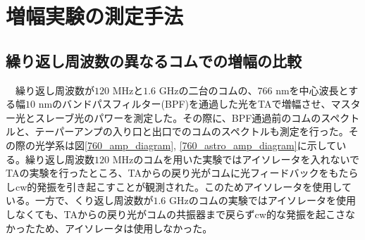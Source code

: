 \documentclass[uplatex, dvipdfmx, a4paper, report, papersize, 11pt]{jsbook}
\begin{document}
\newpage
\section{増幅実験の測定手法}
\subsection{繰り返し周波数の異なるコムでの増幅の比較}
　繰り返し周波数が$120$ MHzと$1.6$ GHzの二台のコムの、$766$ nmを中心波長とする幅$10$ nmのバンドパスフィルター(BPF)を通過した光をTAで増幅させ、マスター光とスレーブ光のパワーを測定した。その際に、BPF通過前のコムのスペクトルと、テーパーアンプの入り口と出口でのコムのスペクトルも測定を行った。その際の光学系は図\ref{760_amp_diagram}, \ref{760_astro_amp_diagram}に示している。繰り返し周波数$120$ MHzのコムを用いた実験ではアイソレータを入れないでTAの実験を行ったところ、TAからの戻り光がコムに光フィードバックをもたらしcw的発振を引き起こすことが観測された。このためアイソレータを使用している。一方で、くり返し周波数が$1.6$ GHzのコムの実験ではアイソレータを使用しなくても、TAからの戻り光がコムの共振器まで戻らずcw的な発振を起こさなかったため、アイソレータは使用しなかった。\\
\end{document}
